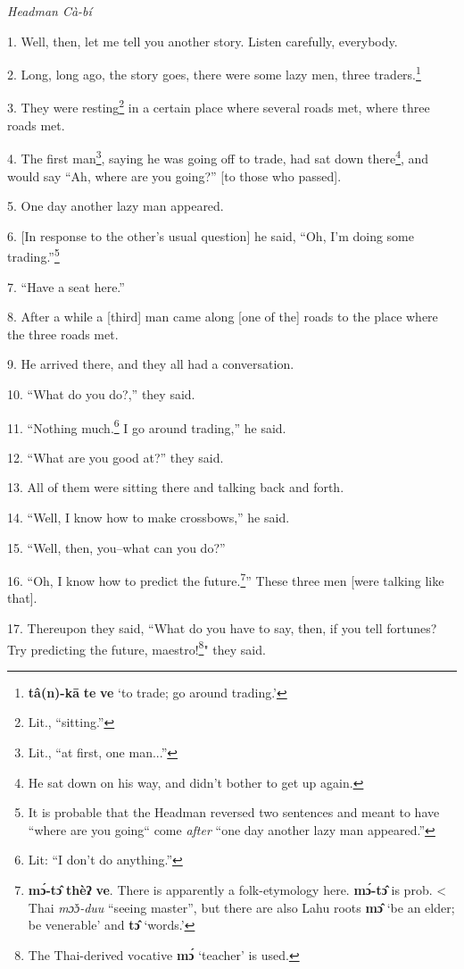 \setcounter{footnote}{0}

\textit{Headman Cà-bí}

1. Well, then, let me tell you another story. Listen carefully, everybody.

2. Long, long ago, the story goes, there were some lazy men, three traders.\footnote{\textbf{tâ(n)-kā} \textbf{te} \textbf{ve} `to trade; go around trading.'}

3. They were resting\footnote{Lit., ``sitting.''} in a certain place where several roads met, where three
roads met.

4. The first man\footnote{Lit., ``at first, one man...''}, saying he was going off to trade, had sat down there\footnote{He sat down on his way, and didn't bother to get up again.},
and would say ``Ah, where are you going?'' [to those who passed].

5. One day another lazy man appeared.

6. [In response to the other's usual question] he said, ``Oh, I'm doing
some trading.''\footnote{It is probable that the Headman reversed two sentences and meant to have ``where are you going`` come \textit{after} ``one day another lazy man appeared.''}

7. ``Have a seat here.''

8. After a while a [third] man came along [one of the] roads to the place where
the three roads met.

9. He arrived there, and they all had a conversation.

10. ``What do you do?,'' they said.

11. ``Nothing much.\footnote{Lit: ``I don't do anything.''} I go around trading,'' he said.

12. ``What are you good at?'' they said.

13. All of them were sitting there and talking back and forth.

14. ``Well, I know how to make crossbows,'' he said.

15. ``Well, then, you--what can you do?''

16. ``Oh, I know how to predict the future.\footnote{\textbf{mɔ́-tɔ̂} \textbf{thèʔ} \textbf{ve}. There is apparently a folk-etymology here. \textbf{mɔ́-tɔ̂} is prob. < Thai \textit{mɔ̌ɔ-duu} ``seeing master'', but there are also Lahu roots \textbf{mɔ̂} `be an elder; be venerable' and \textbf{tɔ̂} `words.'}'' These three men
[were talking like that].

17. Thereupon they said, ``What do you have to say, then, if you tell fortunes?
Try predicting the future, maestro!\footnote{The Thai-derived vocative \textbf{mɔ́} `teacher' is used.}" they said.

